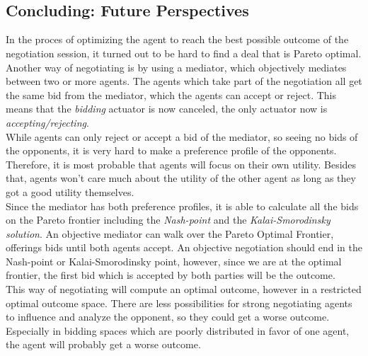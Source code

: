  \\ 

 \\

\subsection{Concluding: Future Perspectives}
In the proces of optimizing the agent to reach the best possible outcome of the negotiation session, it turned out to be hard to find a deal that is Pareto optimal. Another way of negotiating is by using a mediator, which objectively mediates between two or more agents. The agents which take part of the negotiation all get the same bid from the mediator, which the agents can accept or reject. This means that the \textit{bidding} actuator is now canceled, the only actuator now is \textit{accepting/rejecting}.\\

While agents can only reject or accept a bid of the mediator, so seeing no bids of the opponents, it is very hard to make a preference profile of the opponents. Therefore, it is most probable that agents will focus on their own utility. Besides that, agents won't care much about the utility of the other agent as long as they got a good utility themselves.  \\

Since the mediator has both preference profiles, it is able to calculate all the bids on the Pareto frontier including the \textit{Nash-point} and the \textit{Kalai-Smorodinsky solution}. An objective mediator can walk over the Pareto Optimal Frontier, offerings bids until both agents accept. An objective negotiation should end in the Nash-point or Kalai-Smorodinsky point, however, since we are at the optimal frontier, the first bid which is accepted by both parties will be the outcome. \\

This way of negotiating will compute an optimal outcome, however in a restricted optimal outcome space. There are less possibilities for strong negotiating agents to influence and analyze the opponent, so they could get a worse outcome. Especially in bidding spaces which are poorly distributed in favor of one agent, the agent will probably get a worse outcome.

